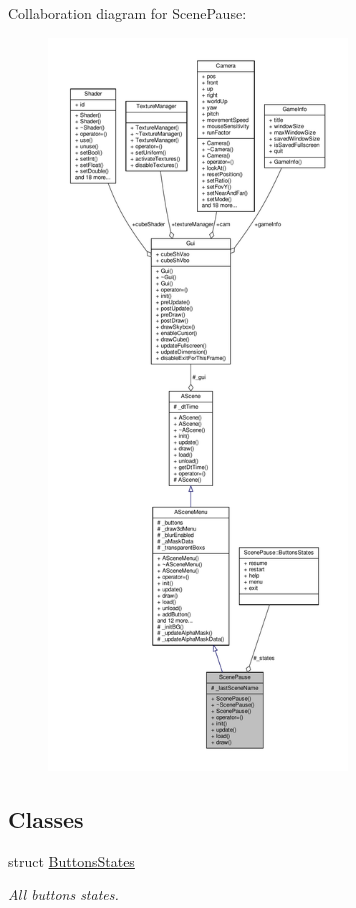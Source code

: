 Collaboration diagram for Scene\+Pause\+:
\nopagebreak
\begin{figure}[H]
\begin{center}
\leavevmode
\includegraphics[height=550pt]{class_scene_pause__coll__graph}
\end{center}
\end{figure}
\subsection*{Classes}
\begin{DoxyCompactItemize}
\item 
struct \hyperlink{struct_scene_pause_1_1_buttons_states}{Buttons\+States}
\begin{DoxyCompactList}\small\item\em All buttons states. \end{DoxyCompactList}\end{DoxyCompactItemize}

